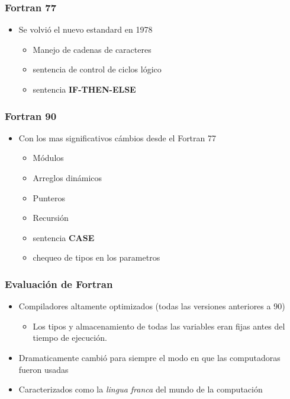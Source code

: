 \documentclass[11pt]{article}
\begin{document}
\subsubsection*{Fortran 77}
\label{sec:orgheadline45}
\begin{itemize}
\item Se volvió el nuevo estandard en 1978
\begin{itemize}
\item Manejo de cadenas de caracteres
\item sentencia de control de ciclos lógico
\item sentencia \textbf{IF-THEN-ELSE}
\end{itemize}
\end{itemize}

\subsubsection*{Fortran 90}
\label{sec:orgheadline46}
\begin{itemize}
\item Con los mas significativos cámbios desde el Fortran 77
\begin{itemize}
\item Módulos
\item Arreglos dinámicos
\item Punteros
\item Recursión
\item sentencia \textbf{CASE}
\item chequeo de tipos en los parametros
\end{itemize}
\end{itemize}

\subsubsection*{Evaluación de Fortran}
\label{sec:orgheadline47}
\begin{itemize}
\item Compiladores altamente optimizados (todas las versiones anteriores a 90)
\begin{itemize}
\item Los tipos y almacenamiento de todas las variables eran fijas antes del
tiempo de ejecución.
\end{itemize}
\item Dramaticamente cambió para siempre el modo en que las computadoras
fueron usadas
\item Caracterizados como la \emph{lingua franca} del mundo de la computación
\end{itemize}
\end{document}
